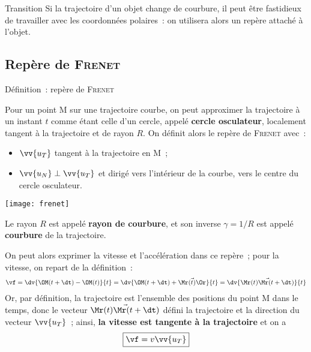 \documentclass[../main/main.tex]{subfiles}
\begin{document}
\begin{instruc}[trans]{Transition}
    Si la trajectoire d'un objet change de courbure, il peut être fastidieux de
    travailler avec les coordonnées polaires~: on utilisera alors un repère
    attaché à l'objet.
\end{instruc}

\subsection{Repère de \textsc{Frenet}}

\begin{tdefi}{Définition~: repère de \textsc{Frenet}}
    \begin{minipage}{0.70\linewidth}
        Pour un point M sur une trajectoire courbe, on peut approximer la
        trajectoire à un instant $t$ comme étant celle d'un cercle, appelé
        \textbf{cercle osculateur}, localement tangent à la trajectoire et de rayon
        $R$. On définit alors le repère de \textsc{Frenet} avec~: \bigbreak
        \begin{itemize}
            \item $\vv{u_T}$ tangent à la trajectoire en M~;
            \item $\vv{u_N} \perp \vv{u_T}$ et dirigé vers l'intérieur de la
                courbe, vers le centre du cercle osculateur.
        \end{itemize}
    \end{minipage}
    \hfill
    \begin{minipage}{0.25\linewidth}
        \begin{center}
            \texttt{[image: frenet]}
        \end{center}
    \end{minipage} \bigbreak
    Le rayon $R$ est appelé \textbf{rayon de courbure}, et son inverse $\gamma =
    1/R$ est appelé \textbf{courbure} de la trajectoire.
\end{tdefi}

On peut alors exprimer la vitesse et l'accélération dans ce repère~; pour la
vitesse, on repart de la définition~:
\begin{gather*}
    \vf
        = \dv{\OM(t+\dt)-\OM(t)}{t}
        = \dv{\OM(t+\dt)+\vec{\Mr(t)\Or}}{t}
        = \dv{\vec{\Mr(t)\Mr(t+\dt)}}{t}
\end{gather*}
Or, par définition, la trajectoire est l'ensemble des positions du point M dans
le temps, donc le vecteur $\vec{\Mr(t)\Mr(t+\dt)}$ défini la trajectoire et la
direction du vecteur $\vv{u_T}$~; ainsi, \textbf{la vitesse est tangente à la
trajectoire} et on a
\[
    \boxed{\vf = v\vv{u_T}}
\]
\end{document}
